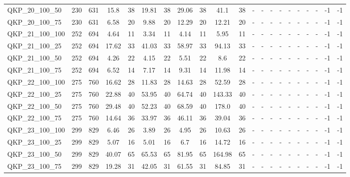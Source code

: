 \begin{sidewaystable}[!ht]
{\begin{tabular}{lcccccccccccccccccccc}
QKP\_20\_100\_50 & 230 & 631 &  \textcolor{blue2}{15.8} & 38 & 19.81 & 38 & 29.06 & 38 & 41.1 & 38 &  - &  - &  - &  - &  - &  - &  - &  - & -1 & -1 \\
QKP\_20\_100\_75 & 230 & 631 &  \textcolor{blue2}{6.58} & 20 & 9.88 & 20 & 12.29 & 20 & 12.21 & 20 &  - &  - &  - &  - &  - &  - &  - &  - & -1 & -1 \\
QKP\_21\_100\_100 & 252 & 694 & 4.64 & 11 &  \textcolor{blue2}{3.34} & 11 & 4.14 & 11 & 5.95 & 11 &  - &  - &  - &  - &  - &  - &  - &  - & -1 & -1 \\
QKP\_21\_100\_25 & 252 & 694 &  \textcolor{blue2}{17.62} & 33 & 41.03 & 33 & 58.97 & 33 & 94.13 & 33 &  - &  - &  - &  - &  - &  - &  - &  - & -1 & -1 \\
QKP\_21\_100\_50 & 252 & 694 & 4.26 & 22 &  \textcolor{blue2}{4.15} & 22 & 5.51 & 22 & 8.6 & 22 &  - &  - &  - &  - &  - &  - &  - &  - & -1 & -1 \\
QKP\_21\_100\_75 & 252 & 694 &  \textcolor{blue2}{6.52} & 14 & 7.17 & 14 & 9.31 & 14 & 11.98 & 14 &  - &  - &  - &  - &  - &  - &  - &  - & -1 & -1 \\
QKP\_22\_100\_100 & 275 & 760 & 16.62 & 28 &  \textcolor{blue2}{11.83} & 28 & 14.63 & 28 & 52.59 & 28 &  - &  - &  - &  - &  - &  - &  - &  - & -1 & -1 \\
QKP\_22\_100\_25 & 275 & 760 &  \textcolor{blue2}{22.88} & 40 & 53.95 & 40 & 64.74 & 40 & 143.33 & 40 &  - &  - &  - &  - &  - &  - &  - &  - & -1 & -1 \\
QKP\_22\_100\_50 & 275 & 760 &  \textcolor{blue2}{29.48} & 40 & 52.23 & 40 & 68.59 & 40 & 178.0 & 40 &  - &  - &  - &  - &  - &  - &  - &  - & -1 & -1 \\
QKP\_22\_100\_75 & 275 & 760 &  \textcolor{blue2}{14.64} & 36 & 33.97 & 36 & 46.11 & 36 & 39.04 & 36 &  - &  - &  - &  - &  - &  - &  - &  - & -1 & -1 \\
QKP\_23\_100\_100 & 299 & 829 & 6.46 & 26 &  \textcolor{blue2}{3.89} & 26 & 4.95 & 26 & 10.63 & 26 &  - &  - &  - &  - &  - &  - &  - &  - & -1 & -1 \\
QKP\_23\_100\_25 & 299 & 829 & 5.07 & 16 &  \textcolor{blue2}{5.01} & 16 & 6.7 & 16 & 14.72 & 16 &  - &  - &  - &  - &  - &  - &  - &  - & -1 & -1 \\
QKP\_23\_100\_50 & 299 & 829 &  \textcolor{blue2}{40.07} & 65 & 65.53 & 65 & 81.95 & 65 & 164.98 & 65 &  - &  - &  - &  - &  - &  - &  - &  - & -1 & -1 \\
QKP\_23\_100\_75 & 299 & 829 &  \textcolor{blue2}{19.28} & 31 & 42.05 & 31 & 61.55 & 31 & 84.85 & 31 &  - &  - &  - &  - &  - &  - &  - &  - & -1 & -1 \\

\end{tabular}}
\end{sidewaystable}
